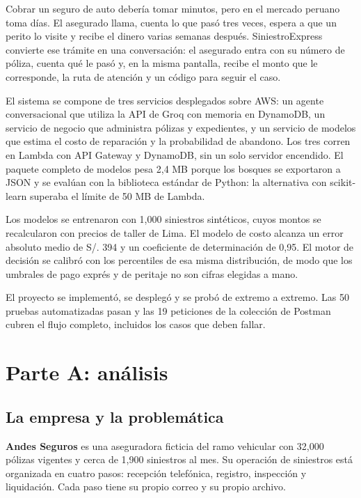 \documentclass[12pt,letterpaper]{article}
\begin{document}
Cobrar un seguro de auto debería tomar minutos, pero en el mercado peruano toma días.
El asegurado llama, cuenta lo que pasó tres veces, espera a que un perito lo visite y
recibe el dinero varias semanas después. SiniestroExpress convierte ese trámite en una
conversación: el asegurado entra con su número de póliza, cuenta qué le pasó y, en la
misma pantalla, recibe el monto que le corresponde, la ruta de atención y un código para
seguir el caso.

El sistema se compone de tres servicios desplegados sobre AWS: un agente conversacional
que utiliza la API de Groq con memoria en DynamoDB, un servicio de negocio que administra
pólizas y expedientes, y un servicio de modelos que estima el costo de reparación y la
probabilidad de abandono. Los tres corren en Lambda con API Gateway y DynamoDB, sin un
solo servidor encendido. El paquete completo de modelos pesa 2,4 MB porque los bosques se
exportaron a JSON y se evalúan con la biblioteca estándar de Python: la alternativa con
scikit-learn superaba el límite de 50 MB de Lambda.

Los modelos se entrenaron con 1,000 siniestros sintéticos, cuyos montos se recalcularon
con precios de taller de Lima. El modelo de costo alcanza un error absoluto medio de
S/. 394 y un coeficiente de determinación de 0,95. El motor de decisión se calibró con los
percentiles de esa misma distribución, de modo que los umbrales de pago exprés y de
peritaje no son cifras elegidas a mano.

El proyecto se implementó, se desplegó y se probó de extremo a extremo. Las 50 pruebas
automatizadas pasan y las 19 peticiones de la colección de Postman cubren el flujo
completo, incluidos los casos que deben fallar.

\clearpage
{\small
\tableofcontents
}
\thispagestyle{fancy}

\clearpage
\section{Parte A: análisis}

\subsection{La empresa y la problemática}

\textbf{Andes Seguros} es una aseguradora ficticia del ramo vehicular con 32,000 pólizas
vigentes y cerca de 1,900 siniestros al mes. Su operación de siniestros está organizada
en cuatro pasos: recepción telefónica, registro, inspección y liquidación. Cada paso
tiene su propio correo y su propio archivo.
\end{document}
